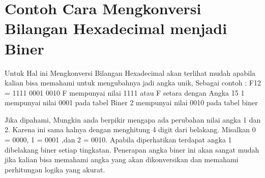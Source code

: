 \section{Contoh Cara Mengkonversi Bilangan Hexadecimal menjadi Biner}
 Untuk Hal ini Mengkonversi Bilangan Hexadecimal akan terlihat mudah apabila kalian bisa memahami untuk mengubahnya jadi angka unik, Sebagai contoh :
 F12 = 1111 0001 0010
 F mempunyai nilai 1111 atau F setara dengan Angka 15
 1 mempunyai nilai 0001 pada tabel Biner
 2 mempunyai nilai 0010 pada tabel biner
 
 Jika dipahami, Mungkin anda berpikir mengapa ada perubahan nilai angka 1 dan 2. Karena ini sama halnya dengan menghitung 4 digit dari belakang.
 Misalkan 0 = 0000, 1 = 0001 ,dan 2 = 0010. Apabila diperhatikan terdapat angka 1 dibelakang biner setiap tingkatan. Penerapan angka biner ini
 akan sangat mudah jika kalian bisa memahami angka yang akan dikonversikan dan memahami perhitungan logika yang akurat.